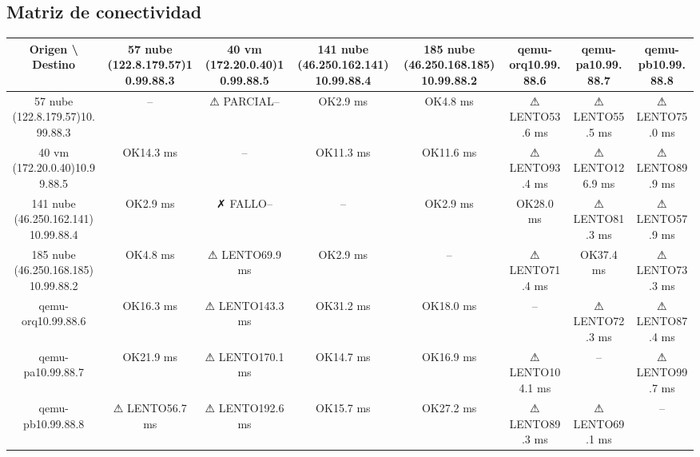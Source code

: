\documentclass[11pt,a4paper]{article}
\begin{document}
\subsection{Matriz de conectividad}
\begin{longtable}{|c|c|c|c|c|c|c|c|}
\hline
Origen \textbackslash{} Destino & 57 nube (122.8.179.57)10.99.88.3 & 40 vm (172.20.0.40)10.99.88.5 & 141 nube (46.250.162.141)10.99.88.4 & 185 nube (46.250.168.185)10.99.88.2 & qemu-orq10.99.88.6 & qemu-pa10.99.88.7 & qemu-pb10.99.88.8 \\ \hline
57 nube (122.8.179.57)10.99.88.3 & -- & ⚠ PARCIAL-- & OK2.9 ms & OK4.8 ms & ⚠ LENTO53.6 ms & ⚠ LENTO55.5 ms & ⚠ LENTO75.0 ms \\ \hline
40 vm (172.20.0.40)10.99.88.5 & OK14.3 ms & -- & OK11.3 ms & OK11.6 ms & ⚠ LENTO93.4 ms & ⚠ LENTO126.9 ms & ⚠ LENTO89.9 ms \\ \hline
141 nube (46.250.162.141)10.99.88.4 & OK2.9 ms & ✗ FALLO-- & -- & OK2.9 ms & OK28.0 ms & ⚠ LENTO81.3 ms & ⚠ LENTO57.9 ms \\ \hline
185 nube (46.250.168.185)10.99.88.2 & OK4.8 ms & ⚠ LENTO69.9 ms & OK2.9 ms & -- & ⚠ LENTO71.4 ms & OK37.4 ms & ⚠ LENTO73.3 ms \\ \hline
qemu-orq10.99.88.6 & OK16.3 ms & ⚠ LENTO143.3 ms & OK31.2 ms & OK18.0 ms & -- & ⚠ LENTO72.3 ms & ⚠ LENTO87.4 ms \\ \hline
qemu-pa10.99.88.7 & OK21.9 ms & ⚠ LENTO170.1 ms & OK14.7 ms & OK16.9 ms & ⚠ LENTO104.1 ms & -- & ⚠ LENTO99.7 ms \\ \hline
qemu-pb10.99.88.8 & ⚠ LENTO56.7 ms & ⚠ LENTO192.6 ms & OK15.7 ms & OK27.2 ms & ⚠ LENTO89.3 ms & ⚠ LENTO69.1 ms & -- \\ \hline
\end{longtable}
\end{document}
